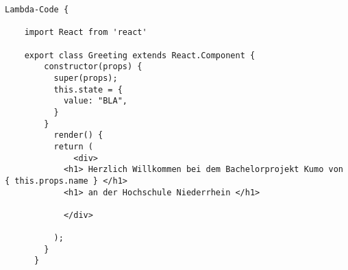 

\begin{lstlisting}[caption={React Greeting.js},
label=lst:React Greeting ,basicstyle=\ttfamily\small ] Lambda-Code {

    import React from 'react'

    export class Greeting extends React.Component {
        constructor(props) {
          super(props);
          this.state = {
            value: "BLA",
          }
        }
          render() {
          return (
              <div>
            <h1> Herzlich Willkommen bei dem Bachelorprojekt Kumo von { this.props.name } </h1>
            <h1> an der Hochschule Niederrhein </h1>

            </div>

          );
        }
      }



\end{lstlisting}
